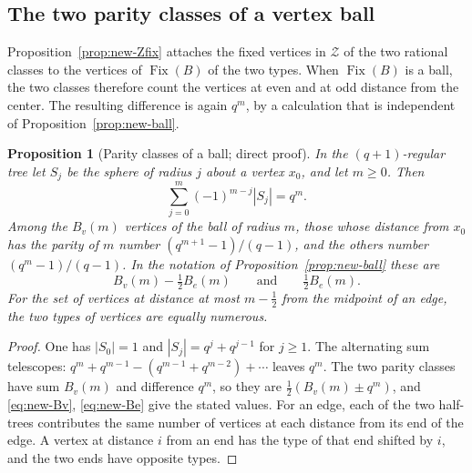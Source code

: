 \documentclass[12pt,letterpaper]{amsart}
\numberwithin{equation}{section}
\newtheorem{proposition}[theorem]{Proposition}
\theoremstyle{definition}
\theoremstyle{plain}
\begin{document}
\subsection{The two parity classes of a vertex ball}
\label{sec:new-parity}

Proposition~\ref{prop:new-Zfix} attaches the fixed vertices in
$\mathcal Z$ of the two rational classes to the vertices of
$\operatorname{Fix}(B)$ of the two types. When
$\operatorname{Fix}(B)$ is a ball, the two classes therefore count
the vertices at even and at odd distance from the center. The
resulting difference is again $q^m$, by a calculation that is
independent of Proposition~\ref{prop:new-ball}.

\begin{proposition}[Parity classes of a ball; direct proof]
\label{prop:new-parity}
In the $(q+1)$-regular tree let $S_j$ be the sphere of radius $j$
about a vertex $x_0$, and let $m\geq0$. Then
\begin{equation}\label{eq:new-alternating}
 \sum_{j=0}^m(-1)^{m-j}|S_j|=q^m .
\end{equation}
Among the $B_v(m)$ vertices of the ball of radius $m$, those whose
distance from $x_0$ has the parity of $m$ number
$(q^{m+1}-1)/(q-1)$, and the others number $(q^m-1)/(q-1)$. In the
notation of Proposition~\ref{prop:new-ball} these are
\[
 B_v(m)-\tfrac12B_e(m)\qquad\text{and}\qquad\tfrac12B_e(m).
\]
For the set of vertices at distance at most $m-\tfrac12$ from the
midpoint of an edge, the two types of vertices are equally numerous.
\end{proposition}
\begin{proof}
One has $|S_0|=1$ and $|S_j|=q^j+q^{j-1}$ for $j\geq1$. The
alternating sum telescopes:
$q^m+q^{m-1}-(q^{m-1}+q^{m-2})+\cdots$ leaves $q^m$. The two parity
classes have sum $B_v(m)$ and difference $q^m$, so they are
$\tfrac12(B_v(m)\pm q^m)$, and \eqref{eq:new-Bv}, \eqref{eq:new-Be}
give the stated values. For an edge, each of the two half-trees contributes the same number
of vertices at each distance from its end of the edge. A vertex at
distance $i$ from an end has the type of that end shifted by $i$,
and the two ends have opposite types.
\end{proof}
\end{document}
